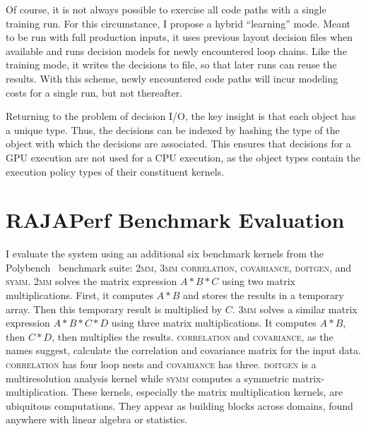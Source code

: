 Of course, it is not always possible to exercise all code paths with a single training run. 
For this circumstance, I propose a hybrid ``learning'' mode.
Meant to be run with full production inputs, it uses previous layout decision files when available and runs decision models for newly encountered loop chains.
Like the training mode, it writes the decisions to file, so that later runs can reuse the results.
With this scheme, newly encountered code paths will incur modeling costs for a single run, but not thereafter.

Returning to the problem of decision I/O, the key insight is that each \FormatDecisions{} object has a unique type.
Thus, the decisions can be indexed by hashing the type of the \FormatDecisions{} object with which the decisions are associated.
This ensures that decisions for a GPU execution are not used for a CPU execution, as the \FormatDecisions{} object types contain the execution policy types of their constituent kernels.


\section{RAJAPerf Benchmark Evaluation}

I evaluate the \FormatDecisions{} system using an additional six benchmark kernels from the Polybench~\cite{pouchet2012polybench} benchmark suite: \textsc{2mm}, \textsc{3mm} \textsc{correlation}, \textsc{covariance}, \textsc{doitgen}, and \textsc{symm}.
\textsc{2mm} solves the matrix expression $A*B*C$ using two matrix multiplications. 
First, it computes $A*B$ and stores the results in a temporary array.
Then this temporary result is multiplied by $C$.
\textsc{3mm} solves a similar matrix expression $A*B*C*D$ using three matrix multiplications.
It computes $A*B$, then $C*D$, then multiplies the results.
\textsc{correlation} and \textsc{covariance}, as the names suggest, calculate the correlation and covariance matrix for the input data. 
\textsc{correlation} has four loop nests and \textsc{covariance} has three.
\textsc{doitgen} is a multiresolution analysis kernel while \textsc{symm} computes a symmetric matrix-multiplication.
These kernels, especially the matrix multiplication kernels, are ubiquitous computations.
They appear as building blocks across domains, found anywhere with linear algebra or statistics.

